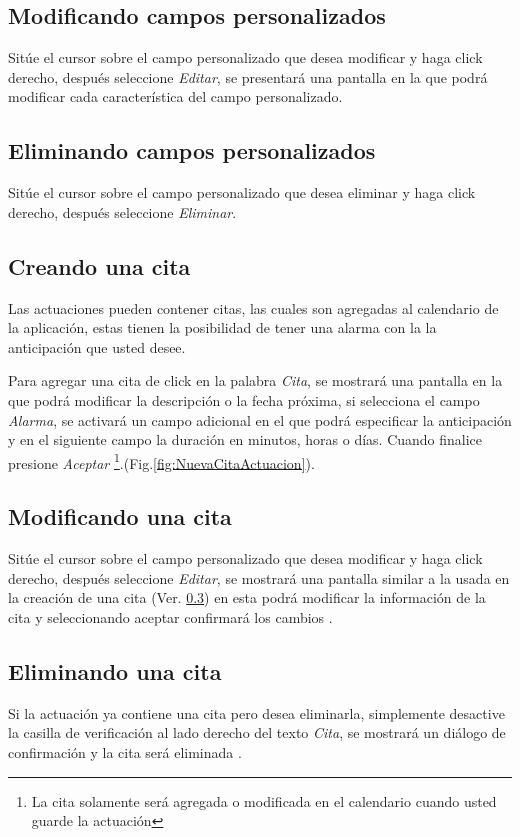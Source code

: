 \subsection{Modificando campos personalizados}
\label{sec:modificarCamposActuacion}
Sit\'ue el cursor sobre el campo personalizado que desea modificar y haga click derecho, despu\'es seleccione \emph{Editar},
se presentar\'a una pantalla en la que podr\'a modificar cada caracter\'istica
del campo personalizado.

\subsection{Eliminando campos personalizados}
\label{sec:eliminarCamposActuacion}
Sit\'ue el cursor sobre el campo personalizado que desea eliminar y haga click derecho, despu\'es seleccione \emph{Eliminar}.

\subsection{Creando una cita}
\label{sec:crearCita}
Las actuaciones pueden contener citas, las cuales son agregadas al calendario de la aplicaci\'on, estas tienen la posibilidad de tener una alarma
con la la anticipaci\'on que usted desee.

Para agregar una cita de click en la palabra \emph{Cita}, se mostrar\'a una
pantalla en la que podr\'a modificar la descripci\'on o la fecha pr\'oxima,
si selecciona el campo \emph{Alarma}, se activar\'a un campo adicional en el
que podr\'a especificar la anticipaci\'on y en el siguiente campo la duraci\'on
en minutos, horas o d\'ias. Cuando finalice presione \emph{Aceptar}
\footnote{La cita solamente ser\'a agregada o modificada en el calendario cuando
usted guarde la actuaci\'on}.(Fig.\ref{fig:NuevaCitaActuacion}). 
  

\subsection{Modificando una cita}
\label{sec:modificarCita}
Sit\'ue el cursor sobre el campo personalizado que desea modificar y haga click derecho, despu\'es seleccione \emph{Editar}, se
mostrar\'a una pantalla similar a la usada en la creaci\'on de una cita (Ver.
\ref{sec:crearCita}) en esta podr\'a modificar la informaci\'on de la cita
y seleccionando aceptar confirmar\'a los cambios
\footnotemark[\value{footnote}].

\subsection{Eliminando una cita}
\label{sec:eliminarCita}
Si la actuaci\'on ya contiene una cita pero desea eliminarla, simplemente desactive la casilla de verificaci\'on al lado derecho del texto \emph{Cita}, se mostrar\'a
un di\'alogo de confirmaci\'on y la cita ser\'a eliminada
\footnotemark[\value{footnote}].